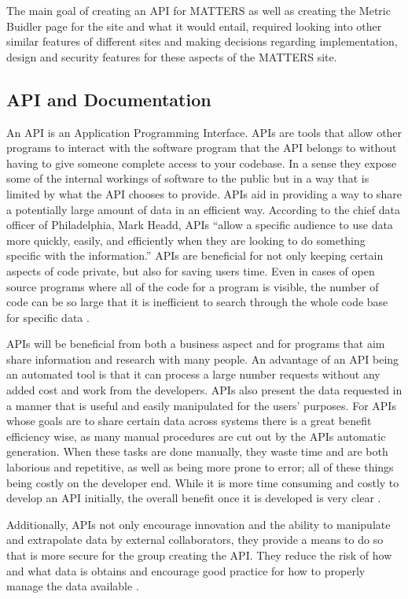 The main goal of creating an API for MATTERS as well as creating the Metric Buidler page for the site and what it would entail, required looking into other similar features of different sites and making decisions regarding implementation, design and security features for these aspects of the MATTERS site.

\subsection{API and Documentation}

An API is an Application Programming Interface. APIs are tools that allow other programs to interact with the software program that the API belongs to without having to give someone complete access to your codebase. In a sense they expose some of the internal workings of software to the public but in a way that is limited by what the API chooses to provide. APIs aid in providing a way to share a potentially large amount of data in an efficient way. According to the chief data officer of Philadelphia, Mark Headd, APIs “allow a specific audience to use data more quickly, easily, and efficiently when they are looking to do something specific with the information.” APIs are beneficial for not only keeping certain aspects of code private, but also for saving users time. Even in cases of open source programs where all of the code for a program is visible, the number of code can be so large that it is inefficient to search through the whole code base for specific data \cite{govapi}. 

APIs will be beneficial from both a business aspect and for programs that aim share information and research with many people. An advantage of an API being an automated tool is that it can process a large number requests without any added cost and work from the developers. APIs also present the data requested in a manner that is useful and easily manipulated for the users’ purposes. For APIs whose goals are to share certain data across systems there is a great benefit efficiency wise, as many manual procedures are cut out by the APIs automatic generation. When these tasks are done manually, they waste time and are both laborious and repetitive, as well as being more prone to error; all of these things being costly on the developer end. While it is more time consuming and costly to develop an API initially, the overall benefit once it is developed is very clear \cite{govapi}.

Additionally, APIs not only encourage innovation and the ability to manipulate and extrapolate data by external collaborators, they provide a means to do so that is more secure for the group creating the API. They reduce the risk of how and what data is obtains and encourage good practice for how to properly manage the data available \cite{readwrite}.

